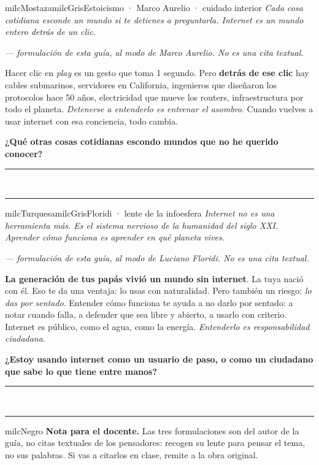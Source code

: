 \documentclass[11pt,letterpaper]{article}
\newcommand{\linead}[1]{\noindent\color{milcLinea}\rule{#1}{0.5pt}\color{milcNegro}}
\begin{document}
\begin{softbox}{milcMostaza}{milcGris}{Estoicismo · Marco Aurelio · cuidado interior}
\textit{Cada cosa cotidiana esconde un mundo si te detienes a preguntarla. Internet es un mundo entero detrás de un clic.}

{\footnotesize\itshape\color{milcNegro!70}--- formulación de esta guía, al modo de Marco Aurelio. No es una cita textual.}

Hacer clic en \emph{play} es un gesto que toma 1 segundo. Pero \textbf{detrás de ese clic} hay cables submarinos, servidores en California, ingenieros que diseñaron los protocolos hace 50 años, electricidad que mueve los routers, infraestructura por todo el planeta. \emph{Detenerse a entenderlo es entrenar el asombro}. Cuando vuelves a usar internet con esa conciencia, todo cambia.

\textbf{¿Qué otras cosas cotidianas escondo mundos que no he querido conocer?}
\end{softbox}
\linead{\linewidth}\\[1mm]
\linead{\linewidth}

\begin{softbox}{milcTurquesa}{milcGris}{Floridi · lente de la infoesfera}
\textit{Internet no es una herramienta más. Es el sistema nervioso de la humanidad del siglo XXI. Aprender cómo funciona es aprender en qué planeta vives.}

{\footnotesize\itshape\color{milcNegro!70}--- formulación de esta guía, al modo de Luciano Floridi. No es una cita textual.}

\textbf{La generación de tus papás vivió un mundo sin internet}. La tuya nació con él. Eso te da una ventaja: lo usas con naturalidad. Pero también un riesgo: \emph{lo das por sentado}. Entender cómo funciona te ayuda a no darlo por sentado: a notar cuando falla, a defender que sea libre y abierto, a usarlo con criterio. Internet es público, como el agua, como la energía. \emph{Entenderlo es responsabilidad ciudadana}.

\textbf{¿Estoy usando internet como un usuario de paso, o como un ciudadano que sabe lo que tiene entre manos?}
\end{softbox}
\linead{\linewidth}\\[1mm]
\linead{\linewidth}

\begin{infoband}{milcNegro}
\textbf{Nota para el docente.} Las tres formulaciones son del autor de la guía, no citas textuales de los pensadores: recogen su lente para pensar el tema, no sus palabras. Si vas a citarlos en clase, remite a la obra original.
\end{infoband}
\end{document}
